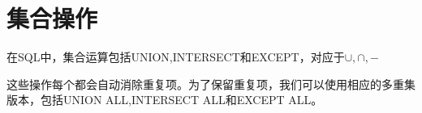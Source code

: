 \section{集合操作}

在SQL中，集合运算包括UNION,INTERSECT和EXCEPT，对应于$\cup,\cap,-$

这些操作每个都会自动消除重复项。为了保留重复项，我们可以使用相应的多重集版本，包括UNION ALL,INTERSECT ALL和EXCEPT ALL。

